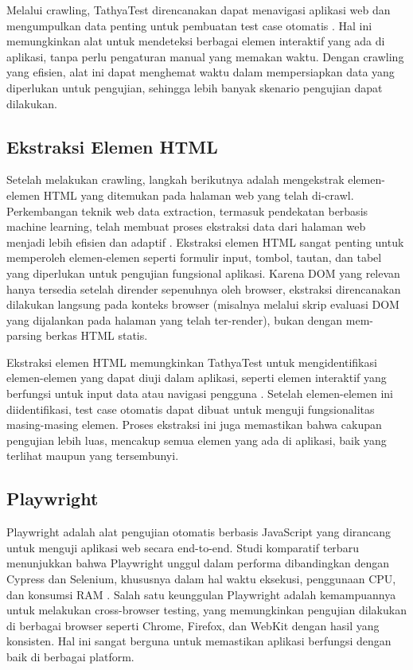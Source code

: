 Melalui crawling, TathyaTest direncanakan dapat menavigasi aplikasi web dan mengumpulkan data penting untuk pembuatan test case otomatis \parencite{leotta2021}. Hal ini memungkinkan alat untuk mendeteksi berbagai elemen interaktif yang ada di aplikasi, tanpa perlu pengaturan manual yang memakan waktu. Dengan crawling yang efisien, alat ini dapat menghemat waktu dalam mempersiapkan data yang diperlukan untuk pengujian, sehingga lebih banyak skenario pengujian dapat dilakukan.

\subsection{Ekstraksi Elemen HTML}\label{ekstraksi-elemen-html}

Setelah melakukan crawling, langkah berikutnya adalah mengekstrak elemen-elemen HTML yang ditemukan pada halaman web yang telah di-crawl. Perkembangan teknik web data extraction, termasuk pendekatan berbasis machine learning, telah membuat proses ekstraksi data dari halaman web menjadi lebih efisien dan adaptif \parencite{patnaik2021}. Ekstraksi elemen HTML sangat penting untuk memperoleh elemen-elemen seperti formulir input, tombol, tautan, dan tabel yang diperlukan untuk pengujian fungsional aplikasi. Karena DOM yang relevan hanya tersedia setelah dirender sepenuhnya oleh browser, ekstraksi direncanakan dilakukan langsung pada konteks browser (misalnya melalui skrip evaluasi DOM yang dijalankan pada halaman yang telah ter-render), bukan dengan mem-parsing berkas HTML statis.

Ekstraksi elemen HTML memungkinkan TathyaTest untuk mengidentifikasi elemen-elemen yang dapat diuji dalam aplikasi, seperti elemen interaktif yang berfungsi untuk input data atau navigasi pengguna \parencite{romano2022}. Setelah elemen-elemen ini diidentifikasi, test case otomatis dapat dibuat untuk menguji fungsionalitas masing-masing elemen. Proses ekstraksi ini juga memastikan bahwa cakupan pengujian lebih luas, mencakup semua elemen yang ada di aplikasi, baik yang terlihat maupun yang tersembunyi.

\subsection{Playwright}\label{playwright}

Playwright adalah alat pengujian otomatis berbasis JavaScript yang dirancang untuk menguji aplikasi web secara end-to-end. Studi komparatif terbaru menunjukkan bahwa Playwright unggul dalam performa dibandingkan dengan Cypress dan Selenium, khususnya dalam hal waktu eksekusi, penggunaan CPU, dan konsumsi RAM \parencite{mon2025}. Salah satu keunggulan Playwright adalah kemampuannya untuk melakukan cross-browser testing, yang memungkinkan pengujian dilakukan di berbagai browser seperti Chrome, Firefox, dan WebKit dengan hasil yang konsisten. Hal ini sangat berguna untuk memastikan aplikasi berfungsi dengan baik di berbagai platform.

